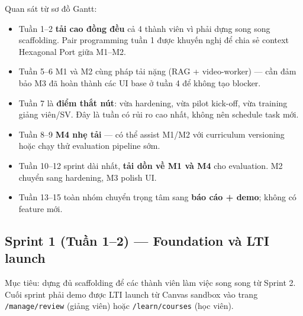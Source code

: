 Quan sát từ sơ đồ Gantt:
\begin{itemize}
    \item Tuần 1--2 \textbf{tải cao đồng đều} cả 4 thành viên vì phải
          dựng song song scaffolding. Pair programming tuần 1 được
          khuyến nghị để chia sẻ context Hexagonal Port giữa M1--M2.
    \item Tuần 5--6 M1 và M2 cùng pháp tải nặng (RAG + video-worker)
          --- cần đảm bảo M3 đã hoàn thành các UI base ở tuần 4 để
          không tạo blocker.
    \item Tuần 7 là \textbf{điểm thắt nút}: vừa hardening, vừa pilot
          kick-off, vừa training giảng viên/SV. Đây là tuần có rủi ro
          cao nhất, không nên schedule task mới.
    \item Tuần 8--9 \textbf{M4 nhẹ tải} --- có thể assist M1/M2 với
          curriculum versioning hoặc chạy thử evaluation pipeline sớm.
    \item Tuần 10--12 sprint dài nhất, \textbf{tải dồn về M1 và M4} cho
          evaluation. M2 chuyển sang hardening, M3 polish UI.
    \item Tuần 13--15 toàn nhóm chuyển trọng tâm sang \textbf{báo cáo +
          demo}; không có feature mới.
\end{itemize}

\subsection{Sprint 1 (Tuần 1--2) --- Foundation và LTI launch}
\label{subsec:sprint1-gd2}

Mục tiêu: dựng đủ scaffolding để các thành viên làm việc song song từ
Sprint 2. Cuối sprint phải demo được LTI launch từ Canvas sandbox vào
trang \texttt{/manage/review} (giảng viên) hoặc \texttt{/learn/courses}
(học viên).

